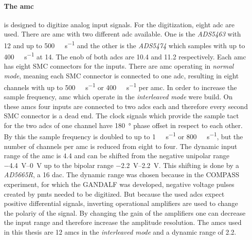 \paragraph{The \ac{amc}} is designed to digitize analog input signals.
For the digitization, eight \ac{adc} are used.
There are \ac{amc} with two different \ac{adc} available.
One is the \textit{ADS5463} with \SI{12}{\bit} and up to \SI{500}{\mega\sample\per\second} and the other is the \textit{ADS5474} which samples with up to \SI{400}{\mega\sample\per\second} at \SI{14}{\bit}.
The \ac{enob} of both \acp{adc} are \SI{10.4}{\bit} and \SI{11.2}{\bit} respectively.
Each \ac{amc} has eight SMC connectors for the inputs.
There are \ac{amc} operating in \textit{normal mode}, meaning each SMC connector is connected to one \ac{adc}, resulting in eight channels with up to \SI{500}{\mega\sample\per\second} or \SI{400}{\mega\sample\per\second} per \ac{amc}.
In order to increase the sample frequency, \ac{amc} which operate in the \textit{interleaved mode} were build.
On these \acp{amc} four inputs are connected to two \ac{adc}s each and therefore every second SMC connector is a dead end.
The clock signals which provide the sample tact for the two \acp{adc} of one channel have \SI{180}{\degree} phase offset in respect to each other.
By this the sample frequency is doubled to up to \SI{1}{\giga\sample\per\second} or \SI{800}{\mega\sample\per\second}, but the number of channels per \ac{amc} is reduced from eight to four.
The dynamic input range of the \ac{amc} is \SI{4.4}{\vpp} and can be shifted from the negative unipolar range \SIrange{-4.4}{0}{\volt} up to the bipolar range \SIrange{-2.2}{2.2}{\volt}.
This shifting is done by a \textit{AD5665R}, a \SI{16}{\bit} \ac{dac}.
The dynamic range was chosen because in the COMPASS experiment, for which the GANDALF was developed, negative voltage pulses created by \acp{pmt} needed to be digitized.
But because the used \acp{adc} expect positive differential signals, inverting operational amplifiers are used to change the polariy of the signal.
By changing the gain of the amplifiers one can decrease the input range and therefore increase the amplitude resolution.
The \acp{amc} used in this thesis are \SI{12}{\bit} \acp{amc} in the \textit{interleaved mode} and a dynamic range of \SI{2.2}{\vpp}.


